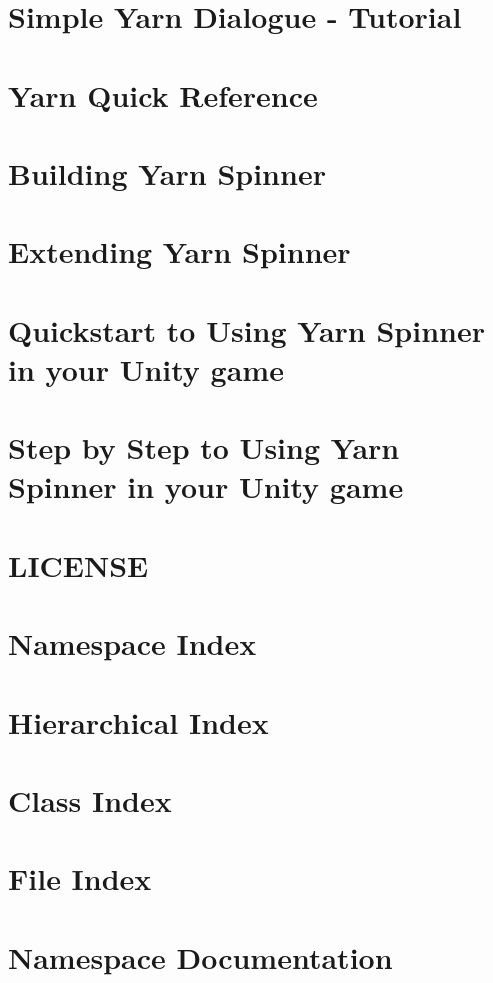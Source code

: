 \documentclass[twoside]{book}
\begin{document}
\chapter{Simple Yarn Dialogue -\/ Tutorial}
\label{a00014}
\hypertarget{a00014}{}

\chapter{Yarn Quick Reference}
\label{a00016}
\hypertarget{a00016}{}

\chapter{Building Yarn Spinner}
\label{a00018}
\hypertarget{a00018}{}

\chapter{Extending Yarn Spinner}
\label{a00020}
\hypertarget{a00020}{}

\chapter{Quickstart to Using Yarn Spinner in your Unity game}
\label{a00022}
\hypertarget{a00022}{}

\chapter{Step by Step to Using Yarn Spinner in your Unity game}
\label{a00024}
\hypertarget{a00024}{}

\chapter{L\-I\-C\-E\-N\-S\-E}
\label{a00026}
\hypertarget{a00026}{}

\chapter{Namespace Index}

\chapter{Hierarchical Index}

\chapter{Class Index}

\chapter{File Index}

\chapter{Namespace Documentation}












\end{document}

